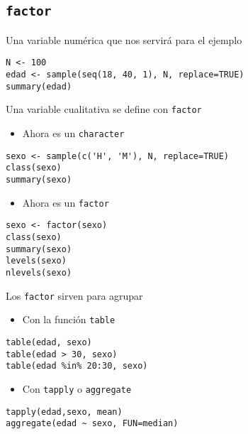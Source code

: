 \documentclass[xcolor={usenames,svgnames,dvipsnames}]{beamer}
\begin{document}
\subsection{\texttt{factor}}
\label{sec-5-1}
\begin{frame}[fragile,label=sec-5-1-1]{Una variable numérica que nos servirá para el ejemplo}
 \lstset{language=R,numbers=none}
\begin{lstlisting}
N <- 100
edad <- sample(seq(18, 40, 1), N, replace=TRUE)
summary(edad)
\end{lstlisting}
\end{frame}
\begin{frame}[fragile,label=sec-5-1-2]{Una variable cualitativa se define con \texttt{factor}}
 \begin{itemize}
\item Ahora es un \texttt{character}
\end{itemize}
\lstset{language=R,numbers=none}
\begin{lstlisting}
sexo <- sample(c('H', 'M'), N, replace=TRUE)
class(sexo)
summary(sexo)
\end{lstlisting}
\begin{itemize}
\item Ahora es un \texttt{factor}
\end{itemize}
\lstset{language=R,numbers=none}
\begin{lstlisting}
sexo <- factor(sexo)
class(sexo)
summary(sexo)
levels(sexo)
nlevels(sexo)
\end{lstlisting}
\end{frame}
\begin{frame}[fragile,label=sec-5-1-3]{Los \texttt{factor} sirven para agrupar}
 \begin{itemize}
\item Con la función \texttt{table}
\end{itemize}
\lstset{language=R,numbers=none}
\begin{lstlisting}
table(edad, sexo)
table(edad > 30, sexo)
table(edad %in% 20:30, sexo)
\end{lstlisting}

\begin{itemize}
\item Con \texttt{tapply} o \texttt{aggregate}
\end{itemize}
\lstset{language=R,numbers=none}
\begin{lstlisting}
tapply(edad,sexo, mean)
aggregate(edad ~ sexo, FUN=median)
\end{lstlisting}
\end{frame}
\end{document}
